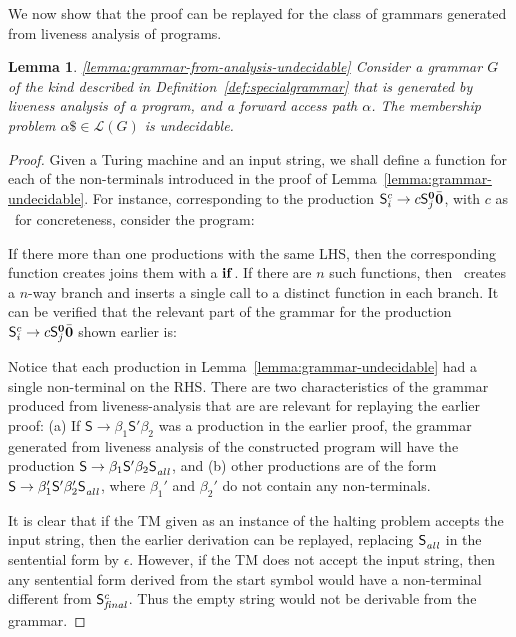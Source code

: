 \documentclass[preprint,9pt]{sigplanconf}
\newtheorem{lemma}[theorem]{Lemma}
\begin{document}
We now show that the proof can be replayed for the class of grammars
generated from liveness analysis of programs. 

\begin{lemma}\ref{lemma:grammar-from-analysis-undecidable}
Consider    a    grammar    $G$    of   the    kind    described    in
Definition~\ref{def:specialgrammar}  that  is  generated  by  liveness
analysis  of a  program,  and  a forward  access  path $\alpha$.   The
membership problem $\alpha\$ \in \mathscr{L}(G)$ is undecidable.
\end{lemma} 

\begin{proof}
Given a Turing machine and an input string, we shall define a function
for   each  of   the  non-terminals   introduced  in   the  proof   of
Lemma~\ref{lemma:grammar-undecidable}.
For instance, corresponding to the production $\mathsf{S}_{i}^{c} \rightarrow
c \mathsf{S}_{j}^{\mathbf{0}}\bar{\mathbf{0}}$, with $c$ as \acar\ for concreteness, consider
the program:


If there more than one productions with the same LHS, then the
corresponding function creates joins them with a $\mbox{$\mathbf{ if}$}$.   If there
are $n$ such functions,  then \mainpgm\  creates  a $n$-way
branch  and inserts  a  single call  to a  distinct  function in  each
branch. It can  be verified that the relevant part  of the grammar for
the production $\mathsf{S}_{i}^{c} \rightarrow
c \mathsf{S}_{j}^{\mathbf{0}}\bar{\mathbf{0}}$ shown earlier is:

Notice that  each production  in Lemma~\ref{lemma:grammar-undecidable}
had a single non-terminal on the RHS. There are two characteristics of
the grammar produced from liveness-analysis  that are are relevant for
replaying the  earlier proof:  (a) If $\mathsf{S}  \rightarrow \beta_1
\mathsf{S'}  \beta_2$  was a  production  in  the earlier  proof,  the
grammar  generated from  liveness  analysis of the constructed program
will  have the  production
$\mathsf{S}      \rightarrow      \beta_1     \mathsf{S'}      \beta_2
\mathsf{S}_{\mathit{all}}^{}$,  and (b)  other  productions are  of the  form
$\mathsf{S}       \rightarrow       \beta_1'\mathsf{S'}       \beta_2'
\mathsf{S}_{\mathit{all}}^{}$, where $\beta_1'$ and $\beta_2'$ do not contain
any non-terminals.

It is clear that if the TM given as an instance of the halting problem
accepts the input string, then the earlier derivation can be replayed,
replacing   $\mathsf{S}_{\mathit{all}}^{}$   in   the  sentential   form   by
$\epsilon$. However, if the TM does  not accept the input string, then
any  sentential  form derived  from  the  start  symbol would  have  a
non-terminal different from $\mathsf{S}_{\mathit{final}}^{c}$. Thus the empty
string would not be derivable from the grammar.
\end{proof}
\end{document}
